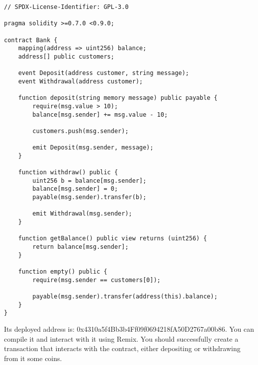 \documentclass[12pt,addpoints,answers]{exam}
\begin{document}
\begin{questions}
{\begin{verbatim}
// SPDX-License-Identifier: GPL-3.0

pragma solidity >=0.7.0 <0.9.0;

contract Bank {
    mapping(address => uint256) balance;
    address[] public customers;

    event Deposit(address customer, string message);
    event Withdrawal(address customer);

    function deposit(string memory message) public payable {
        require(msg.value > 10);
        balance[msg.sender] += msg.value - 10;

        customers.push(msg.sender);

        emit Deposit(msg.sender, message);
    }

    function withdraw() public {
        uint256 b = balance[msg.sender];
        balance[msg.sender] = 0;
        payable(msg.sender).transfer(b);

        emit Withdrawal(msg.sender);
    }

    function getBalance() public view returns (uint256) {
        return balance[msg.sender];
    }

    function empty() public {
        require(msg.sender == customers[0]);

        payable(msg.sender).transfer(address(this).balance);
    }
}
\end{verbatim}

} %

 Its deployed address is: 0x4310a5f4Bb3b4Ff09f0694218fA50D2767a00b86. You can compile it and interact with it using Remix. You should successfully create a transaction that interacts with the contract, either depositing or withdrawing from it some coins.

\end{questions}
\end{document}

